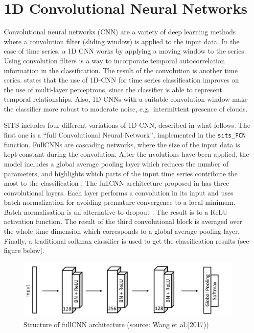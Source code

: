 \documentclass[a4paper,]{tufte-book}
\begin{document}
\hypertarget{d-convolutional-neural-networks}{%
\section{1D Convolutional Neural Networks}\label{d-convolutional-neural-networks}}

Convolutional neural networks (CNN) are a variety of deep learning methods where a convolution filter (sliding window) is applied to the input data. In the case of time series, a 1D CNN works by applying a moving window to the series. Using convolution filters is a way to incorporate temporal autocorrelation information in the classification. The result of the convolution is another time series. \citet{Russwurm2017} states that the use of 1D-CNN for time series classification improves on the use of multi-layer perceptrons, since the classifier is able to represent temporal relationships. Also, 1D-CNNs with a suitable convolution window make the classifier more robust to moderate noise, e.g.~intermittent presence of clouds.

SITS includes four different variations of 1D-CNN, described in what follows. The first one is a ``full Convolutional Neural Network''\citep{Wang2017}, implemented in the \texttt{sits\_FCN} function. FullCNNs are cascading networks, where the size of the input data is kept constant during the convolution. After the nvolutions have been applied, the model includes a global average pooling layer which reduces the number of parameters, and highlights which parts of the input time series contribute the most to the classification \citep{Fawaz2019}. The fullCNN architecture proposed in \citet{Wang2017} has three convolutional layers. Each layer performs a convolution in its input and uses batch normalization for avoiding premature convergence to a local minimum. Batch normalisation is an alternative to dropout \citep{Ioffe2015}. The result is to a ReLU activation function. The result of the third convolutional block is averaged over the whole time dimension which corresponds to a global average pooling layer. Finally, a traditional softmax classifier is used to get the classification results (see figure below).

\begin{figure}

{\centering \includegraphics[width=0.8\linewidth,height=0.8\textheight]{images/fullcnn} 

}

\caption[Structure of fullCNN architecture (source]{Structure of fullCNN architecture (source: Wang et al.(2017))}\label{fig:unnamed-chunk-52}
\end{figure}
\end{document}
